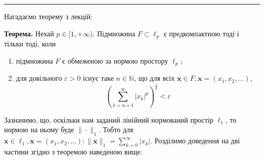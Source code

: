 \documentclass[a5paper, 20pt, titlepage]{article}
\newcommand{\x}{\textbf{x}}
\begin{document}
\noindent\rule{4cm}{0.4pt}

Нагадаємо теорему з лекцій:

\textbf{Теорема.} \quad  Нехай $p \in [1, +\infty)$. Підмножина $F \subset \ell_p$ є предкомпактною тоді і тільки тоді, коли
\begin{enumerate}
\item підмножина $F$ є обмеженою за нормою простору $\ell_p$; \vspace{-3mm}
\item для довільного $\varepsilon > 0$ існує таке $n \in \mathbb{N}$, що для всіх $\x \in F, \x = (x_1, x_2, \dots)$, $$\left( \sum \limits_{k = n + 1}^{\infty}|x_k|^p\right)^{\frac{1}{p}} < \varepsilon$$
\end{enumerate}

Зазначимо, що, оскільки нам заданий лінійний нормований простір $\ell_1$, то нормою на ньому буде $\| \cdot \|_1$. Тобто для $\x \in \ell_1, \x = (x_1, x_2, \dots): \| \x \|_ 1 = \sum \limits_{k = 0}^{\infty} |x_k|$. Розділимо доведення на дві частини згідно з теоремою наведеною вище:
\end{document}
